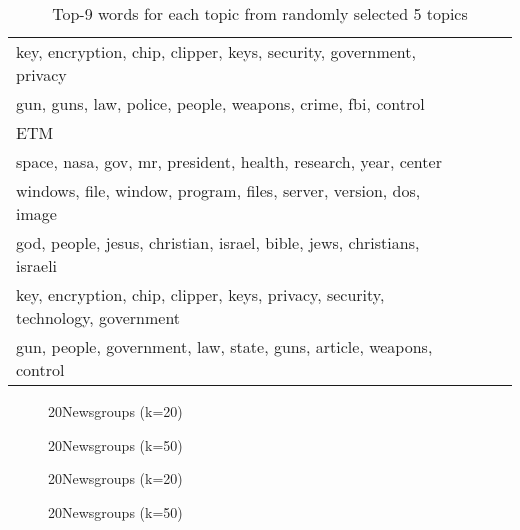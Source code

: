 \begin{table}[h]
\begin{tabular}{llll}
key, encryption, chip, clipper, keys, security, government, privacy\\
gun, guns, law, police, people, weapons, crime, fbi, control
\\ \hline
\hline
ETM  \\ \hline
space, nasa, gov, mr, president, health, research, year, center\\
windows, file, window, program, files, server, version, dos, image\\
god, people, jesus, christian, israel, bible, jews, christians, israeli\\
key, encryption, chip, clipper, keys, privacy, security, technology, government\\
gun, people, government, law, state, guns, article, weapons, control
\\ \hline
\end{tabular}
\label{tbl:t3}
\caption{Top-9 words for each topic from randomly selected 5 topics}
\end{table}
\begin{figure}[h]
\centering
{}%
\hfill
{}%
\hfill
\caption{20Newsgroups (k=20)}
\label{fig:loss_20ng_20t}
\end{figure}
\begin{figure}
\centering
{}%
\hfill
{}%
\hfill
\caption{20Newsgroups (k=50)}
\label{fig:loss_20ng_50t}
\end{figure}
\begin{figure}
\centering
{}%
\hfill
{}%
\hfill
{}%
\hfill
\caption{20Newsgroups (k=20)}
\label{fig:eval_20ng_20t}
\end{figure}
\begin{figure}
\centering
{}%
\hfill
{}%
\hfill
{}%
\hfill
\caption{20Newsgroups (k=50)}
\label{fig:eval_20ng_50t}
\end{figure}
